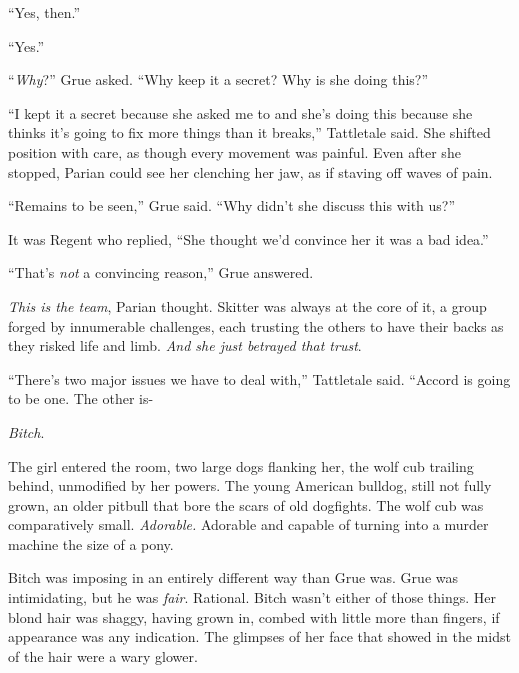``Yes, then.''



``Yes.''



``\emph{Why}?''  Grue asked.  ``Why keep it a secret?  Why is she doing this?''



``I kept it a secret because she asked me to and she's doing this because she thinks it's going to fix more things than it breaks,'' Tattletale said.  She shifted position with care, as though every movement was painful.  Even after she stopped, Parian could see her clenching her jaw, as if staving off waves of pain.



``Remains to be seen,'' Grue said.  ``Why didn't she discuss this with us?''



It was Regent who replied, ``She thought we'd convince her it was a bad idea.''



``That's \emph{not} a convincing reason,'' Grue answered.



\emph{This is the team}, Parian thought.  Skitter was always at the core of it, a group forged by innumerable challenges, each trusting the others to have their backs as they risked life and limb.  \emph{And she just betrayed that trust}.



``There's two major issues we have to deal with,'' Tattletale said.  ``Accord is going to be one.  The other is-



\emph{Bitch}.



The girl entered the room, two large dogs flanking her, the wolf cub trailing behind, unmodified by her powers.  The young American bulldog, still not fully grown, an older pitbull that bore the scars of old dogfights.  The wolf cub was comparatively small.  \emph{Adorable.  }Adorable and capable of turning into a murder machine the size of a pony.



Bitch was imposing in an entirely different way than Grue was.  Grue was intimidating, but he was \emph{fair}.  Rational.  Bitch wasn't either of those things.  Her blond hair was shaggy, having grown in, combed with little more than fingers, if appearance was any indication. The glimpses of her face that showed in the midst of the hair were a wary glower.



